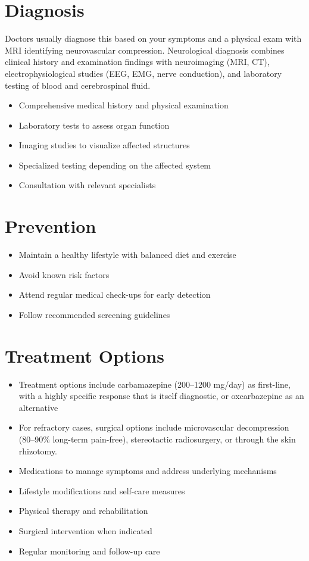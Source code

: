 \section{Diagnosis}
Doctors usually diagnose this based on your symptoms and a physical exam with MRI identifying neurovascular compression. Neurological diagnosis combines clinical history and examination findings with neuroimaging (MRI, CT), electrophysiological studies (EEG, EMG, nerve conduction), and laboratory testing of blood and cerebrospinal fluid.

\begin{itemize}[noitemsep]
  \item Comprehensive medical history and physical examination
  \item Laboratory tests to assess organ function
  \item Imaging studies to visualize affected structures
  \item Specialized testing depending on the affected system
  \item Consultation with relevant specialists
\end{itemize}
\section{Prevention}
\begin{itemize}[noitemsep]
  \item Maintain a healthy lifestyle with balanced diet and exercise
  \item Avoid known risk factors
  \item Attend regular medical check-ups for early detection
  \item Follow recommended screening guidelines
\end{itemize}
\section{Treatment Options}
\begin{itemize}[noitemsep]
  \item Treatment options include carbamazepine (200--1200 mg/day) as first-line, with a highly specific response that is itself diagnostic, or oxcarbazepine as an alternative
  \item For refractory cases, surgical options include microvascular decompression (80--90\% long-term pain-free), stereotactic radiosurgery, or through the skin rhizotomy.
  \item Medications to manage symptoms and address underlying mechanisms
  \item Lifestyle modifications and self-care measures
  \item Physical therapy and rehabilitation
  \item Surgical intervention when indicated
  \item Regular monitoring and follow-up care
\end{itemize}
